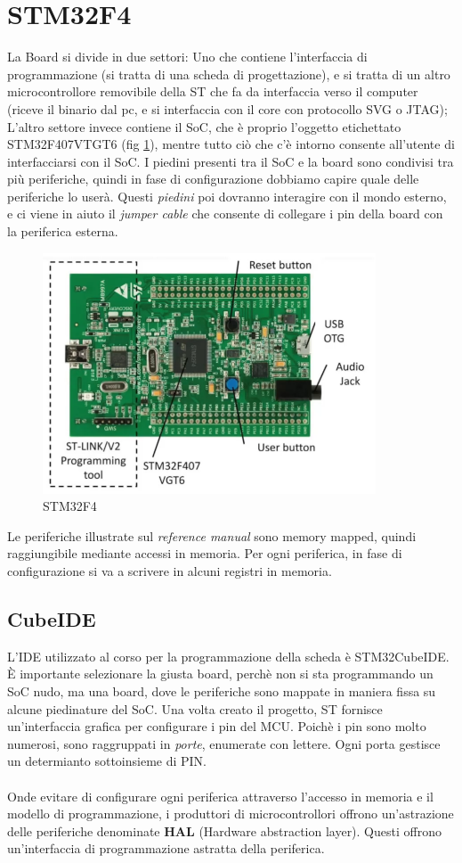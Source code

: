 \section{STM32F4}
La Board si divide in due settori: Uno che contiene l'interfaccia di programmazione (si tratta di una scheda di progettazione), e si tratta di un altro microcontrollore removibile della ST che fa da interfaccia verso il computer (riceve il binario dal pc, e si interfaccia con il core con protocollo SVG o JTAG); L'altro settore invece contiene il SoC, che è proprio l'oggetto etichettato STM32F407VTGT6 (fig \ref{img:STM32F4}), mentre tutto ciò che c'è intorno consente all'utente di interfacciarsi con il SoC. 
I piedini presenti tra il SoC e la board sono condivisi tra più periferiche, quindi in fase di configurazione dobbiamo capire quale delle periferiche lo userà. Questi \textit{piedini} poi dovranno interagire con il mondo esterno, e ci viene in aiuto il \textit{jumper cable} che consente di collegare i pin della board con la periferica esterna.


\begin{figure}[h!]
    \centering
    \includegraphics[width=.7\textwidth]{img/STM32F4.png}
    \caption{STM32F4}
    \label{img:STM32F4}
\end{figure}


Le periferiche illustrate sul \textit{reference manual} sono memory mapped, quindi raggiungibile mediante accessi in memoria. Per ogni periferica, in fase di configurazione si va a scrivere in alcuni registri in memoria. 

\subsection{CubeIDE}
L'IDE utilizzato al corso per la programmazione della scheda è STM32CubeIDE. \uppercase{è} importante selezionare la giusta board, perchè non si sta programmando un SoC nudo, ma una board, dove le periferiche sono mappate in maniera fissa su alcune piedinature del SoC. 
Una volta creato il progetto, ST fornisce un'interfaccia grafica per configurare i pin del MCU. 
Poichè i pin sono molto numerosi, sono raggruppati in \textit{porte}, enumerate con lettere. Ogni porta gestisce un determianto sottoinsieme di PIN. 
\\
\\
Onde evitare di configurare ogni periferica attraverso l'accesso in memoria e il modello di programmazione, i produttori di microcontrollori offrono un'astrazione delle periferiche denominate \textbf{HAL} (Hardware abstraction layer). Questi offrono un'interfaccia di programmazione astratta della periferica. 
